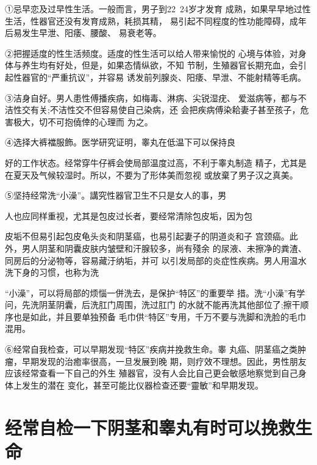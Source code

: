 \documentclass[12pt,UTF8]{ctexbook}
\begin{document}
①忌早恋及过早性生活。一般而言，男子到22~24岁才发育
成熟，如果早早地过性生活，性器官还没有发育成熟，耗损其精，
易引起不同程度的性功能障碍，成年后易发生早泄、阳痿、腰酸、
易衰老等。

②把握适度的性生活频度。适度的性生活可以给人带来愉悦的
心境与体验，对身体与养生均有好处，但是，如果态情纵欲，不知
节制，生殖器官长期充血，会引起性器官的“严重抗议”，并容易
诱发前列腺炎、阳痿、早泄、不能射精等毛病。

③洁身自好。男人患性傅播疾病，如梅毒、淋病、尖锐湿疣、
爱滋病等，都与不洁性交有关;不洁性交不但容易使自己染病，还
会把疾病傅染耠妻子甚至孩子，危害极大，切不可抱僥倖的心理而
为之。

④选择大裤襠服飾。医学研究证明，睾丸在低温下可以保持良

好的工作状态。经常穿牛仔裤会使局部温度过高，不利于睾丸制造
精子，尤其是在夏天及气候较湿时。所以，不要为了形体美而忽视
或放棄了男子汉之真美。

⑤坚持经常洗“小澡”。講究性器官卫生不只是女人的事，男

人也应同样重视，尤其是包皮过长者，要经常清除包皮垢，因为包

皮垢不但易引起包皮龟头炎和阴茎癌，也易引起妻子的阴道炎和子
宫颈癌。此外，男人阴茎和阴囊皮肤内皱壁和汗腺较多，尚有殘余
的尿液、未擦净的粪渣、同房后的分泌物等，容易藏汙纳垢，并可
以引发局部的炎症性疾病。男人用温水洗下身的习惯，也称为洗

“小澡”，可以将局部的烦惱一併洗去，是保护“特区”的重要举
措。洗“小澡”有学问，先洗阴茎阴囊，后洗肛门周围，洗过肛门
的水就不能再洗其他部位了;擦干顺序也是如此，并且要单独预备
毛巾供“特区”专用，千万不要与洗脚和洗脸的毛巾混用。

⑥经常自我检查，可以早期发现“特区”疾病并挽救生命。睾
丸癌、阴茎癌之类肿瘤，早期发现的治癒率很高，一旦发展到晚
期，则疗效不理想。因此，男性朋友应该经常查看一下自己的外生
殖器官，没有人会比自己更会敏感地察觉到自己身体上发生的潜在
变化，甚至可能比仪器检查还要“靈敏”和早期发现。

\section{经常自检一下阴茎和睾丸有时可以挽救生命}
\end{document}
